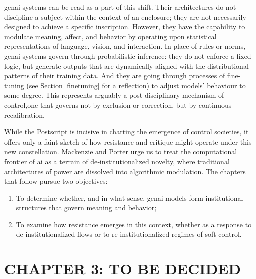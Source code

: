\Gls{genai} systems can be read as a part of this shift. Their architectures do not discipline a subject within the context of an enclosure; they are not necessarily designed to achieve a specific inscription. However, they have the capability to modulate meaning, affect, and behavior by operating upon statistical representations of language, vision, and interaction. In place of rules or norms, \gls{genai} systems govern through probabilistic inference: they do not enforce a fixed logic, but generate outputs that are dynamically aligned with the distributional patterns of their training data. And they are going through processes of fine-tuning (see Section \ref{finetuning} for a reflection)
to adjust models' behaviour to some degree. This represents arguably a post-disciplinary mechanism of control,one that governs not by exclusion or correction, but by continuous recalibration.

While the Postscript is incisive in charting the emergence of control societies, it offers only a faint sketch of how resistance and critique might operate under this new constellation. Mackenzie and Porter \parencite*[]{mackenzie2021} urge us to treat the computational frontier of \gls{ai} as a terrain of de‑institutionalized novelty, where traditional architectures of power are dissolved into algorithmic modulation. The chapters that follow pursue two objectives:

\begin{enumerate}
	\item To determine whether, and in what sense, \gls{genai} models form
	      institutional structures that govern meaning and behavior;
	\item To examine how resistance emerges in this context, whether as a
	      response to de‑institutionalized flows or to re‑institutionalized regimes
	      of soft control.
\end{enumerate}
%

\noindent\makebox[\linewidth]{\rule{\paperwidth}{0.4pt}}

\section{CHAPTER 3: TO BE DECIDED}
